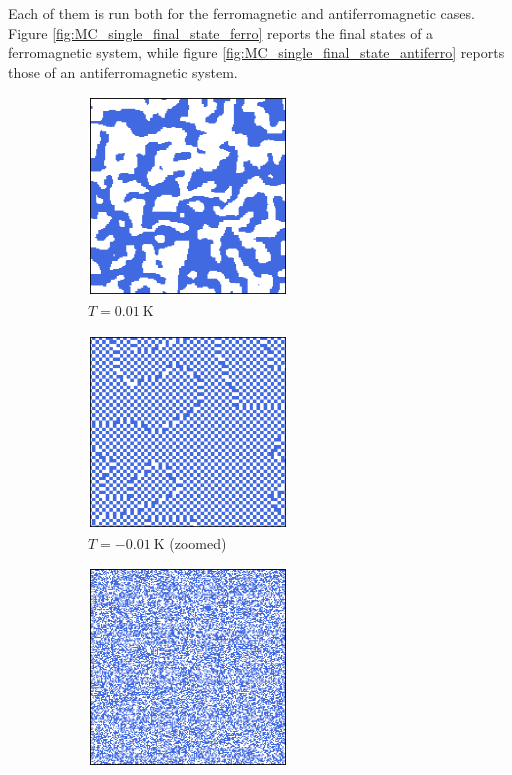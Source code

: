 Each of them is run both for the ferromagnetic and antiferromagnetic cases. \\
Figure \ref{fig:MC_single_final_state_ferro} reports the final states of a ferromagnetic system, while
figure \ref{fig:MC_single_final_state_antiferro} reports those of an antiferromagnetic system.\\
\begin{figure}[ht]
    \begin{subfigure}{.45\textwidth}
        \centering
        \includegraphics[width=200px]{./images/ising/T_001_ferro.eps}
        \caption*{$T = \SI{0.01}{\kelvin}$}
    \end{subfigure}
    \begin{subfigure}{.45\textwidth}
        \centering
        \includegraphics[width=200px]{./images/ising/T_n001_ferro.eps}
        \caption*{\hspace{20pt} $T = \SI{-0.01}{\kelvin}$ (zoomed)}
    \end{subfigure}
    \newline
    \begin{subfigure}{.45\textwidth}
        \centering
        \includegraphics[width=200px]{./images/ising/T_100_ferro.eps}

\end{subfigure}
\end{figure}
